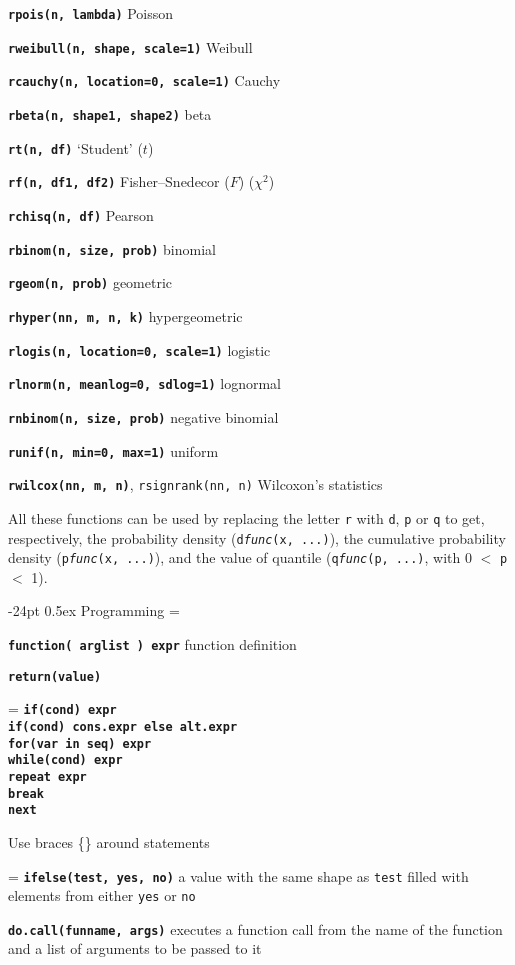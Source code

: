 \documentclass[8pt,landscape]{article}
\makeatletter
\renewcommand\section{\@startsection{section}{1}{0mm}%
                                     {-24pt}%
                                     {0.5ex}%
                                {\color{blue}\normalfont\large\bfseries}}
\newcommand{\code}{\texttt}
\newcommand{\bcode}[1]{\texttt{\textbf{#1}}}
\makeatother
\begin{document}
\begin{multicols*}{3}
\bcode{rpois(n, lambda)} Poisson

\bcode{rweibull(n, shape, scale=1)} Weibull

\bcode{rcauchy(n, location=0, scale=1)} Cauchy  

\bcode{rbeta(n, shape1, shape2)} beta

\bcode{rt(n, df)} `Student' ($t$)  

\bcode{rf(n, df1, df2)} Fisher--Snedecor ($F$)  ($\chi^2$)  

\bcode{rchisq(n, df)} Pearson 

\bcode{rbinom(n, size, prob)} binomial  

\bcode{rgeom(n, prob)} geometric  

\bcode{rhyper(nn, m, n, k)} hypergeometric  

\bcode{rlogis(n, location=0, scale=1)} logistic  

\bcode{rlnorm(n, meanlog=0, sdlog=1)} lognormal  

\bcode{rnbinom(n, size, prob)} negative binomial  

\bcode{runif(n, min=0, max=1)} uniform  

\bcode{rwilcox(nn, m, n)}, \code{rsignrank(nn, n)} Wilcoxon's statistics  

All these functions can be used by replacing the letter \code{r} with
\code{d}, \code{p} or \code{q} to get, respectively, the probability
density (\code{d\textsl{func}(x, ...)}), the cumulative probability
density (\code{p\textsl{func}(x, ...)}), and the value of quantile
(\code{q\textsl{func}(p, ...)}, with 0 $<$ \code{p} $<$ 1).





\section{Programming}
\everypar={\hangindent=9mm}

\bcode{function( arglist ) expr} function definition

\bcode{return(value)}

\everypar={\hangindent=0mm}
\bcode{if(cond) expr\\
if(cond) cons.expr  else  alt.expr\\
for(var in seq) expr\\
while(cond) expr\\
repeat expr\\
break\\
next}

Use braces \{\} around statements


\everypar={\hangindent=9mm}
\bcode{ifelse(test, yes, no)} a value with the same shape as \code{test} filled with elements
from either \code{yes} or \code{no} 

\bcode{do.call(funname, args)} executes a function call from the name of
  the function and a list of arguments to be passed to it

\end{multicols*}
\end{document}
